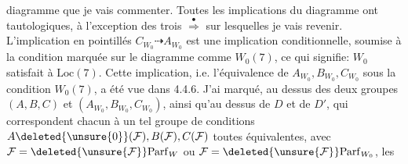 
diagramme que je vais commenter. Toutes les implications  du diagramme ont  tautologiques, à l'exception des trois $\overset{\bullet}{\Longrightarrow}$ sur lesquelles je vais revenir. L'implication en pointillés $C_{W_0}\dashrightarrow A_{W_0}$ est une implication conditionnelle, soumise à la condition marquée sur le diagramme comme $W_0(7)$, ce qui signifie: $W_0$ satisfait à $\mathrm{Loc}(7)$. Cette implication, i.e. l'équivalence de $A_{W_0},B_{W_0},C_{W_0}$ sous la condition $W_0(7)$, a été vue dans 4.4.6. J'ai marqué, au dessus des deux groupes $(A,B,C)$ et $(A_{W_0},B_{W_0},C_{W_0})$, ainsi qu'au dessus de $D$ et de $D'$, qui correspondent chacun à un tel groupe de conditions $A\deleted{\unsure{0}}(\mathcal{F}),B(\mathcal{F}),C(\mathcal{F})$ toutes équivalentes, avec $\mathcal{F}=\deleted{\unsure{\mathcal{F}}}\mathrm{Parf}_{W}$ ou $\mathcal{F}=\deleted{\unsure{\mathcal{F}}}\mathrm{Parf}_{W_0}$\unsure{),}, les

